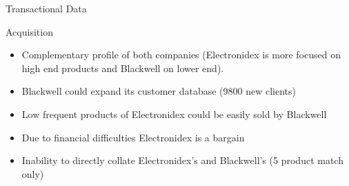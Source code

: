 \documentclass{beamer}
\begin{document}
\begin{frame}{Transactional Data}
\begin{flushleft}
\textbf \footnotesize Acquisition
\end{flushleft}
\begin{itemize}
\item \footnotesize Complementary profile of both companies (Electronidex is more focused on high end products and Blackwell on lower end).
\item \footnotesize Blackwell could expand its customer database (9800 new clients)
\item \footnotesize Low frequent products of Electronidex could be easily sold by Blackwell
\item \footnotesize Due to financial difficulties Electronidex is a bargain
\item \footnotesize Inability to directly collate Electronidex's and Blackwell's (5 product match only)
\end{itemize}

\begin{columns}[onlytextwidth]
\centering
\begin{figure}
\end{figure}
\centering
\vspace{0.5pt}
\centering
\begin{figure}
\centering
\end{figure}
\end{columns}

\end{frame} 
\end{document}
